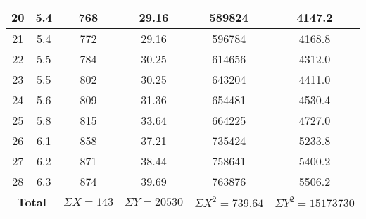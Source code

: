 \begin{table}[H]
\begin{tabular}{|c|c|c|c|c|c|}
		20 & 5.4 & 768 & 29.16 & 589824 & 4147.2 \\ \hline
		21 & 5.4 & 772 & 29.16 & 596784 & 4168.8 \\ \hline
		22 & 5.5 & 784 & 30.25 & 614656 & 4312.0 \\ \hline
		23 & 5.5 & 802 & 30.25 & 643204 & 4411.0 \\ \hline
		24 & 5.6 & 809 & 31.36 & 654481 & 4530.4 \\ \hline
		25 & 5.8 & 815 & 33.64 & 664225 & 4727.0 \\ \hline
		26 & 6.1 & 858 & 37.21 & 735424 & 5233.8 \\ \hline
		27 & 6.2 & 871 & 38.44 & 758641 & 5400.2 \\ \hline
		28 & 6.3 & 874 & 39.69 & 763876 & 5506.2 \\ \hline
		\multicolumn{2}{|c|}{\textbf{Total}} & \textbf{$\Sigma X = 143$} & \textbf{$\Sigma Y = 20530$} & \textbf{$\Sigma X^2 = 739.64$} & \textbf{$\Sigma Y^2 = 15173730$} \\ \hline
	\end{tabular}
\end{table}




